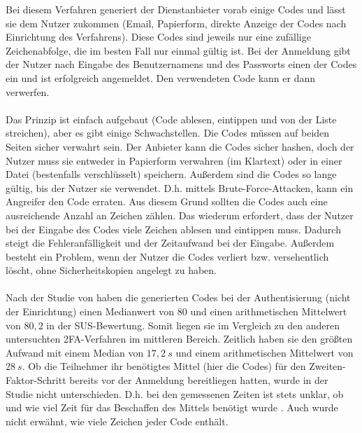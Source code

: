 Bei diesem Verfahren generiert der Dienstanbieter vorab einige Codes und lässt sie 
dem Nutzer zukommen (Email, Papierform, direkte Anzeige der Codes nach Einrichtung 
des Verfahrens). Diese Codes sind jeweils nur eine zufällige Zeichenabfolge, die im 
besten Fall nur einmal gültig ist. Bei der Anmeldung gibt der Nutzer nach Eingabe 
des Benutzernamens und des Passworts einen der Codes ein und ist erfolgreich 
angemeldet. Den verwendeten Code kann er dann verwerfen.
\\\\
Das Prinzip ist einfach aufgebaut (Code ablesen, eintippen und von der Liste streichen), aber es gibt einige Schwachstellen. Die Codes müssen  auf beiden 
Seiten sicher verwahrt sein. Der Anbieter kann die Codes sicher hashen, doch der 
Nutzer muss sie entweder in Papierform verwahren (im Klartext) oder in einer Datei 
(bestenfalls verschlüsselt) speichern. Außerdem sind die Codes so lange gültig, bis 
der Nutzer sie verwendet. D.h. mittels Brute-Force-Attacken, kann ein Angreifer den 
Code erraten. Aus diesem Grund sollten die Codes auch eine ausreichende Anzahl an 
Zeichen zählen. Das wiederum erfordert, dass der Nutzer bei der Eingabe des Codes 
viele Zeichen ablesen und eintippen muss. Dadurch steigt die Fehleranfälligkeit und 
der Zeitaufwand bei der Eingabe. Außerdem besteht ein Problem, wenn der Nutzer die 
Codes verliert bzw. versehentlich löscht, ohne Sicherheitskopien angelegt zu haben. \autocite[359 \psq]{Reese}
\\\\
Nach der Studie von \textcite{Reese} haben die generierten Codes bei der 
Authentisierung (nicht der Einrichtung) einen Medianwert von 80 und einen 
arithmetischen Mittelwert von $80{,}2$ in der SUS-Bewertung. Somit 
liegen sie im Vergleich zu den anderen untersuchten 2FA-Verfahren im mittleren 
Bereich. Zeitlich haben sie den größten Aufwand mit einem Median von $17{,}2~s$ und einem 
arithmetischen Mittelwert von $28~s$. Ob die Teilnehmer ihr 
benötigtes Mittel (hier die Codes) für den Zweiten-Faktor-Schritt bereits vor der 
Anmeldung bereitliegen hatten, wurde in der Studie nicht unterschieden. D.h. bei den 
gemessenen Zeiten ist stets unklar, ob und wie viel Zeit für das Beschaffen des 
Mittels benötigt wurde \autocite[364]{Reese}. Auch wurde nicht erwähnt, wie viele Zeichen jeder 
Code enthält.
